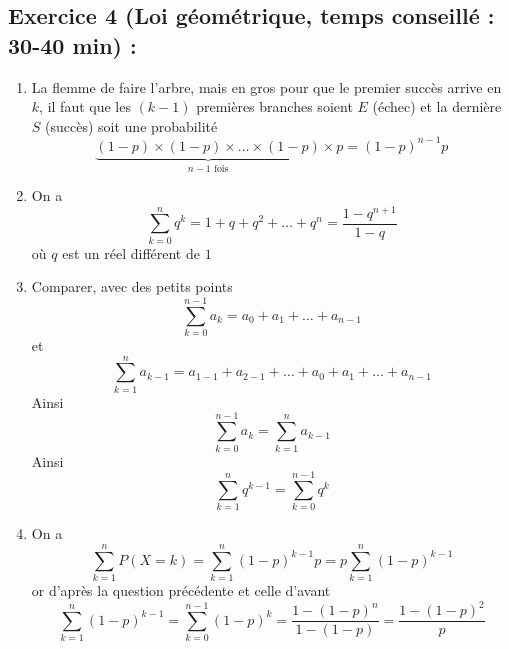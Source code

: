 \subsection*{Exercice 4 (Loi géométrique, temps conseillé : 30-40 min) : }
\begin{enumerate}
\item La flemme de faire l'arbre, mais en gros pour que le premier succès arrive en $k$, il faut que les $(k-1)$ premières branches soient $E$ (échec) et la dernière $S$ (succès) soit une probabilité
$$\underbrace{(1-p)\times (1-p) \times \ldots \times (1-p)}_{n-1 \text{ fois}} \times p = (1-p)^{n-1} p$$
\item On a
$$\boxed{\sum_{k=0}^n q^k = 1 + q + q^2 + \ldots + q^n = \frac{1-q^{n+1}}{1-q}}$$
où $q$ est un réel différent de $1$
\item Comparer, avec des petits points 
$$\sum_{k=0}^{n-1} a_k = a_0 + a_1 + \ldots + a_{n-1}$$ et $$\sum_{k=1}^n a_{k-1} = a_{1-1} + a_{2-1} + \ldots + a_0 + a_1 + \ldots + a_{n-1}$$
Ainsi 
$$\boxed{\sum_{k=0}^{n-1} a_k = \sum_{k=1}^n a_{k-1}}$$
Ainsi 
$$\sum_{k=1}^n q^{k-1} = \sum_{k=0}^{n-1} q^k$$
\item On a
$$\sum_{k=1}^n P(X=k) = \sum_{k=1}^n (1-p)^{k-1} p = p\sum_{k=1}^n (1-p)^{k-1}$$ or d'après la question précédente et celle d'avant $$\sum_{k=1}^n (1-p)^{k-1}=\sum_{k=0}^{n-1} (1-p)^{k} = \frac{1-(1-p)^n}{1-(1-p)} = \frac{1-(1-p)^2}{p}$$


\end{enumerate}
